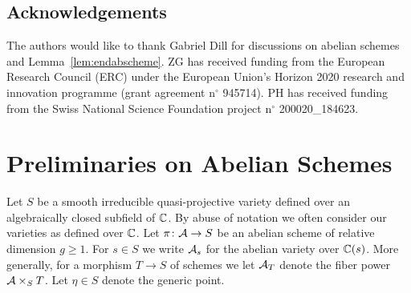 \documentclass[12pt,oneside]{amsart}
\begin{document}
\smallskip








\subsection*{Acknowledgements} The authors would like to thank
Gabriel Dill for discussions on abelian schemes and Lemma~\ref{lem:endabscheme}.
ZG has  received funding from the European Research Council (ERC) under the European Union’s Horizon 2020 research and innovation programme (grant agreement n$^{\circ}$ 945714). 
PH has received funding
from the Swiss National Science Foundation project n$^\circ$
200020\_184623.

\section{Preliminaries on Abelian Schemes}
\label{sec:prelimabsch}

Let $S$ be a smooth irreducible quasi-projective variety defined over
an algebraically closed subfield of 
${\mathbb{C}}$. By abuse of notation we often consider our varieties as defined
over ${\mathbb{C}}$.
Let $\pi\colon \mathcal{A}\rightarrow S$ be an abelian scheme of
relative dimension $g\ge 1$. For $s\in S$ we write $\mathcal{A}_s$ for the abelian
variety over ${\mathbb{C}}(s)$. More generally, for a morphism $T\rightarrow S$
of schemes we let $\mathcal{A}_T$ denote the fiber power $\mathcal{A}\times_S T$. Let $\eta\in S$ denote the generic point. 
\end{document}

